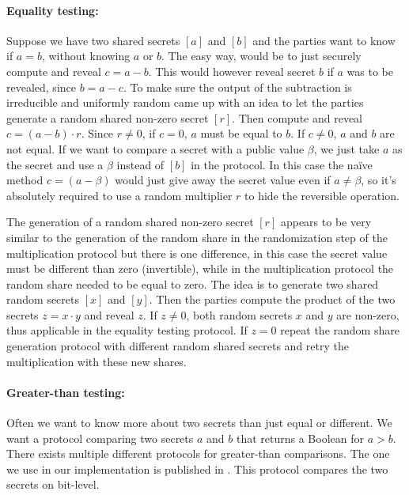 \paragraph{Equality testing:}
Suppose we have two shared secrets $[a]$ and $[b]$ and the parties want to know if $a = b$, without knowing $a$ or $b$.
The easy way, would be to just securely compute and reveal $c = a - b$. This would however reveal secret $b$ if $a$ was to be revealed, since $b = a - c$. To make sure the output of the subtraction is irreducible and uniformly random \cite{franklin1996joint} came up with an idea to let the parties generate a random shared non-zero secret $[r]$.
Then compute and reveal $c = (a - b) \cdot r$. Since $r \neq 0$, if $c = 0$, $a$ must be equal to $b$. If $c \neq 0$, $a$ and $b$ are not equal. If we want to compare a secret with a public value $\beta$, we just take $a$ as the secret and use a $\beta$ instead of $[b]$ in the protocol. In this case the na\"ive method $c = (a - \beta)$ would just give away the secret value even if $a \neq \beta$, so it's absolutely required to use a random multiplier $r$ to hide the reversible operation.

The generation of a random shared non-zero secret $[r]$ appears to be very similar to the generation of the random share in the randomization step of the multiplication protocol but there is one difference, in this case the secret value must be different than zero (invertible), while in the multiplication protocol the random share needed to be equal to zero. The idea is to generate two shared random secrets $[x]$ and $[y]$. Then the parties compute the product of the two secrets $z = x \cdot y$ and reveal $z$. If $z \neq 0$, both random secrets $x$ and $y$ are non-zero, thus applicable in the equality testing protocol. If $z = 0$ repeat the random share generation protocol with different random shared secrets and retry the multiplication with these new shares.

\paragraph{Greater-than testing:}
Often we want to know more about two secrets than just equal or different. We want a protocol comparing two secrets $a$ and $b$ that returns a Boolean for $a>b$. There exists multiple different protocols for greater-than comparisons. The one we use in our implementation is published in \cite{erkin2009privacy}. This protocol compares the two secrets on bit-level.

